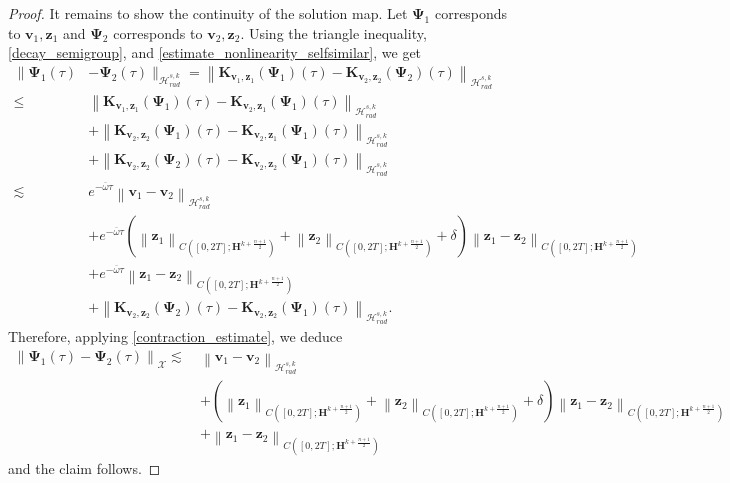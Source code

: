 \documentclass[12pt,reqno]{amsart}
\theoremstyle{plain}
\theoremstyle{remark}
\theoremstyle{plain}
\theoremstyle{definition}
\numberwithin{equation}{section}
\numberwithin{equation}{section}
\newcommand{\norm}[1]{\left\|#1\right\|}
\newcommand{\HH}{\mathcal{H}}
\begin{document}
\begin{proof}
		It remains to show the continuity of the solution map. Let $\mathbf{\Psi}_1$ corresponds to $\mathbf{v}_1,\mathbf{z}_1$ and $\mathbf{\Psi}_2$ corresponds to $\mathbf{v}_2,\mathbf{z}_2$. Using the triangle inequality, \eqref{decay_semigroup}, and \eqref{estimate_nonlinearity_selfsimilar}, we get
		\begin{align*}
			\|\mathbf{\Psi}_1(\tau)&-\mathbf{\Psi}_2(\tau)\|_{\HH_{rad}^{s,k}}= \norm{\mathbf{K}_{\mathbf{v}_1,\mathbf{z}_1}(\mathbf{\Psi}_1)(\tau)-\mathbf{K}_{\mathbf{v}_2,\mathbf{z}_2}(\mathbf{\Psi}_2)(\tau)}_{\HH_{rad}^{s,k}}\\ \leq \ & \norm{\mathbf{K}_{\mathbf{v}_1,\mathbf{z}_1}(\mathbf{\Psi}_1)(\tau)-\mathbf{K}_{\mathbf{v}_2,\mathbf{z}_1}(\mathbf{\Psi}_1)(\tau)}_{\HH_{rad}^{s,k}}\\ & +\norm{\mathbf{K}_{\mathbf{v}_2,\mathbf{z}_2}(\mathbf{\Psi}_1)(\tau)-\mathbf{K}_{\mathbf{v}_2,\mathbf{z}_1}(\mathbf{\Psi}_1)(\tau)}_{\HH_{rad}^{s,k}}\\ &+\norm{\mathbf{K}_{\mathbf{v}_2,\mathbf{z}_2}(\mathbf{\Psi}_2)(\tau)-\mathbf{K}_{\mathbf{v}_2,\mathbf{z}_2}(\mathbf{\Psi}_1)(\tau)}_{\HH_{rad}^{s,k}}\\  \lesssim \ & e^{-\overline{\omega} \tau}\norm{\mathbf{v}_1-\mathbf{v}_2}_{\HH_{rad}^{s,k}}\\ &+ e^{-\overline{\omega} \tau}\left(\norm{\mathbf{z}_1}_{C([0,2T];\mathbf{H}^{k+\frac{n+1}{2}})}+\norm{\mathbf{z}_2}_{C([0,2T];\mathbf{H}^{k+\frac{n+1}{2}})}+\delta\right) \norm{\mathbf{z}_1-\mathbf{z}_2}_{C([0,2T];\mathbf{H}^{k+\frac{n+1}{2}})}\\ & +e^{-\overline{\omega} \tau} \norm{\mathbf{z}_1-\mathbf{z}_2}_{C([0,2T];\mathbf{H}^{k+\frac{n+1}{2}})}\\ &+\norm{\mathbf{K}_{\mathbf{v}_2,\mathbf{z}_2}(\mathbf{\Psi}_2)(\tau)-\mathbf{K}_{\mathbf{v}_2,\mathbf{z}_2}(\mathbf{\Psi}_1)(\tau)}_{\HH_{rad}^{s,k}}.
		\end{align*}
		Therefore, applying \eqref{contraction_estimate}, we deduce
		\begin{align*}
			\norm{\mathbf{\Psi}_1(\tau)-\mathbf{\Psi}_2(\tau)}_{\mathcal{X}}\lesssim \ & \norm{\mathbf{v}_1-\mathbf{v}_2}_{\HH_{rad}^{s,k}}\\ &+ \left(\norm{\mathbf{z}_1}_{C([0,2T];\mathbf{H}^{k+\frac{n+1}{2}})}+\norm{\mathbf{z}_2}_{C([0,2T];\mathbf{H}^{k+\frac{n+1}{2}})}+\delta\right) \norm{\mathbf{z}_1-\mathbf{z}_2}_{C([0,2T];\mathbf{H}^{k+\frac{n+1}{2}})}\\ & +\norm{\mathbf{z}_1-\mathbf{z}_2}_{C([0,2T];\mathbf{H}^{k+\frac{n+1}{2}})}
		\end{align*}
		and the claim follows.
	\end{proof}
\end{document}
